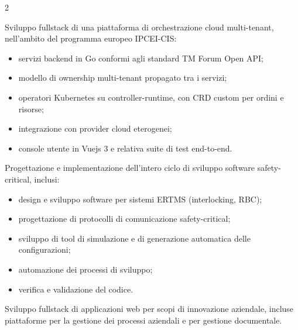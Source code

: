 \documentclass[10pt,a4paper,ragged2e,withhyper]{altacv}
\begin{document}
\begin{paracol}{2}

Sviluppo fullstack di una piattaforma di orchestrazione cloud multi-tenant, nell'ambito del programma europeo IPCEI-CIS:
\begin{itemize}
    \item servizi backend in Go conformi agli standard TM Forum Open API;
    \item modello di ownership multi-tenant propagato tra i servizi;
    \item operatori Kubernetes su controller-runtime, con CRD custom per ordini e risorse;
    \item integrazione con provider cloud eterogenei;
    \item console utente in Vuejs 3 e relativa suite di test end-to-end.
\end{itemize}

\medskip
{}
Progettazione e implementazione dell'intero ciclo di sviluppo software safety-critical, inclusi:
\begin{itemize}
    \item design e sviluppo software per sistemi ERTMS (interlocking, RBC);
    \item progettazione di protocolli di comunicazione safety-critical;
    \item sviluppo di tool di simulazione e di generazione automatica delle configurazioni;
    \item automazione dei processi di sviluppo;
    \item verifica e validazione del codice.
\end{itemize}

Sviluppo fullstack di applicazioni web per scopi di innovazione aziendale, incluse piattaforme per la gestione dei processi aziendali e per gestione documentale.





\medskip
{}



\end{paracol}
\end{document}
